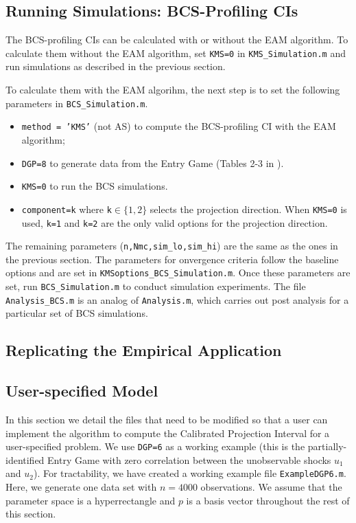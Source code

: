 \documentclass[12pt]{article}
\def\code#1{\texttt{#1}}
\begin{document}
\subsection{Running Simulations: BCS-Profiling CIs}
 The BCS-profiling CIs can be calculated with or without  the EAM algorithm. To calculate them without the EAM algorithm, set \code{KMS=0} in \code{KMS\_Simulation.m} and run simulations as described in the previous section. 
 
 To calculate them with the EAM algorihm, the next step is to set the following parameters in \code{BCS\_Simulation.m}.
\begin{itemize}
    \item \code{method = 'KMS'} (not AS) to compute the BCS-profiling CI with the EAM algorithm;
    \item \code{DGP=8} to generate data from the Entry Game  (Tables 2-3 in ).
    \item \code{KMS=0} to run the BCS simulations.
    \item \code{component=k} where \code{k}$\in \{1,2\}$ selects the projection direction.  When \code{KMS=0} is used, \code{k=1} and \code{k=2} are the only valid options for the projection direction.
    \end{itemize}
The remaining parameters (\code{n,Nmc,sim\_lo,sim\_hi}) are the same as the ones in the previous section. The parameters for onvergence criteria follow the baseline options and are set in \code{KMSoptions\_BCS\_Simulation.m}. Once these parameters are set, run \code{BCS\_Simulation.m} to conduct simulation experiments. The file \code{Analysis\_BCS.m} is an analog of \code{Analysis.m}, which carries out post analysis for a particular set of BCS simulations.


\subsection{Replicating the Empirical Application}

\subsection{User-specified Model}\label{sec:usermodel}
In this section we detail the files that need to be modified so that a user can implement the algorithm to compute the Calibrated Projection Interval for a user-specified problem.  We use \code{DGP=6} as a working example (this is the partially-identified Entry Game with zero correlation between the unobservable shocks $u_1$ and $u_2$).  For tractability, we have created a working example file \code{ExampleDGP6.m}.  Here, we generate one data set with $n=4000$ observations.  We assume that the parameter space is a hyperrectangle and $p$ is a basis vector throughout the rest of this section.
\end{document}
